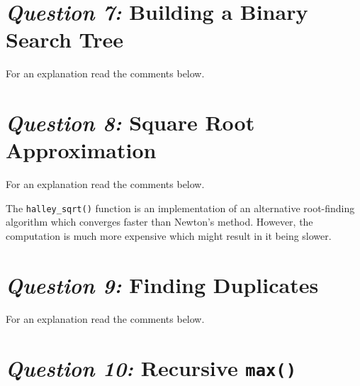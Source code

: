 \documentclass[12pt]{article}
\begin{document}
\section{\textit{Question 7:} Building a Binary Search Tree}

For an explanation read the comments below.







\section{\textit{Question 8:} Square Root Approximation}

For an explanation read the comments below.



The \texttt{halley\_sqrt()} function is an implementation of an
alternative root-finding algorithm \cite{wolframhalley} which
converges faster than Newton's method. However, the computation
is much more expensive which might result in it being slower.





\section{\textit{Question 9:} Finding Duplicates}

For an explanation read the comments below.







\section{\textit{Question 10:} Recursive \texttt{max()}}
\end{document}
